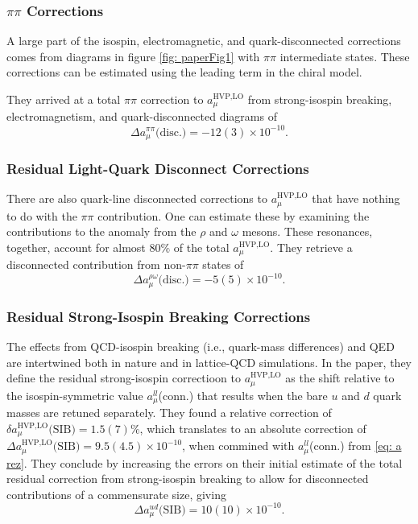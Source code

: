 \documentclass[amsfonts, amssymb, amsmath, preprint, showkeys, nofootinbib,longbibliography]{revtex4-1}
\begin{document}
\subsubsection{$\pi\pi$ Corrections}
A large part of the isospin, electromagnetic, and quark-disconnected corrections comes from diagrams in figure \ref{fig: paperFig1} with $\pi\pi$ intermediate states.
These corrections can be estimated using the leading term in the chiral model.

They arrived at a total $\pi\pi$ correction to $a_\mu^{\text{HVP,LO}}$ from strong-isospin breaking, electromagnetism, and quark-disconnected diagrams of
\begin{equation}
	\Delta a_\mu^{\pi\pi}\text{(disc.)} = -12(3) \times 10^{-10}.
	\label{eq: pipi}
\end{equation}

\subsubsection{Residual Light-Quark Disconnect Corrections}

There are also quark-line disconnected corrections to $a_\mu^{\text{HVP,LO}}$ that have nothing to do with the $\pi\pi$ contribution.
One can estimate these by examining the contributions to the anomaly from the $\rho$ and $\omega$ mesons.
These resonances, together, account for almost $80\%$ of the total $a_\mu^{\text{HVP,LO}}$.
They retrieve a disconnected contribution from non-$\pi\pi$ states of
\begin{equation}
	\Delta a_\mu^{\rho\omega} \text{(disc.)} = -5(5)\times 10^{-10}.
	\label{eq: rhoomega}
\end{equation}

\subsubsection{Residual Strong-Isospin Breaking Corrections}

The effects from QCD-isospin breaking (i.e., quark-mass differences) and QED are intertwined both in nature and in lattice-QCD simulations.
In the paper, they define the residual strong-isospin correctioon to $a_\mu^{\text{HVP,LO}}$ as the shift relative to the isospin-symmetric value $a_\mu^{ll}$(conn.) that results when the bare $u$ and $d$ quark masses are retuned separately.
They found a relative correction of $\delta a_\mu^{\text{HVP,LO}}\text{(SIB)} = 1.5(7)\%$, which translates to an absolute correction of $\Delta a_\mu^{\text{HVP,LO}}\text{(SIB)}=9.5(4.5) \times 10^{-10}$, when commined with $a_\mu^{ll}$(conn.) from \ref{eq: a rez}.
They conclude by increasing the errors on their initial estimate of the total residual correction from strong-isospin breaking to allow for disconnected contributions of a commensurate size, giving
\begin{equation}
	\Delta a_\mu^{ud} \text{(SIB)} = 10(10) \times 10^{-10}.
	\label{eq: ud SIB}
\end{equation}
\end{document}
